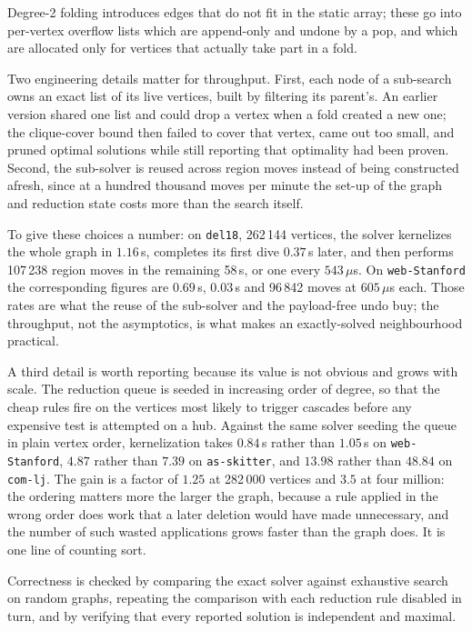 \documentclass[preprint,12pt]{elsarticle}
\theoremstyle{definition}
\begin{document}
Degree-2 folding introduces edges that do not fit in the static array; these go
into per-vertex overflow lists which are append-only and undone by a pop, and
which are allocated only for vertices that actually take part in a fold.

Two engineering details matter for throughput. First, each node of a sub-search
owns an exact list of its live vertices, built by filtering its parent's. An
earlier version shared one list and could drop a vertex when a fold created a new
one; the clique-cover bound then failed to cover that vertex, came out too small,
and pruned optimal solutions while still reporting that optimality had been
proven. Second, the sub-solver is reused across region moves instead of being
constructed afresh, since at a hundred thousand moves per minute the set-up of
the graph and reduction state costs more than the search itself.

To give these choices a number: on \texttt{del18}, 262\,144 vertices, the solver
kernelizes the whole graph in $1.16$\,s, completes its first dive $0.37$\,s
later, and then performs 107\,238 region moves in the remaining 58\,s, or one
every $543$\,$\mu$s. On \texttt{web-Stanford} the corresponding figures are
$0.69$\,s, $0.03$\,s and 96\,842 moves at $605$\,$\mu$s each. Those rates are
what the reuse of the sub-solver and the payload-free undo buy; the throughput,
not the asymptotics, is what makes an exactly-solved neighbourhood practical.

A third detail is worth reporting because its value is not obvious and grows
with scale. The reduction queue is seeded in increasing order of degree, so that
the cheap rules fire on the vertices most likely to trigger cascades before any
expensive test is attempted on a hub. Against the same solver seeding the queue
in plain vertex order, kernelization takes $0.84$\,s rather than $1.05$\,s on
\texttt{web-Stanford}, $4.87$ rather than $7.39$ on \texttt{as-skitter}, and
$13.98$ rather than $48.84$ on \texttt{com-lj}. The gain is a factor of $1.25$ at
282\,000 vertices and $3.5$ at four million: the ordering matters more the larger
the graph, because a rule applied in the wrong order does work that a later
deletion would have made unnecessary, and the number of such wasted applications
grows faster than the graph does. It is one line of counting sort.

Correctness is checked by comparing the exact solver against exhaustive search on
random graphs, repeating the comparison with each reduction rule disabled in
turn, and by verifying that every reported solution is independent and maximal.
\end{document}
